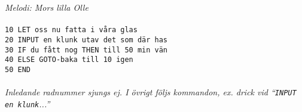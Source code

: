 {\footnotesize\textit{Melodi: Mors lilla Olle}}\\
\\
\texttt{10 LET oss nu fatta i våra glas}\\
\texttt{20 INPUT en klunk utav det som där has}\\
\texttt{30 IF du fått nog THEN till 50 min vän}\\
\texttt{40 ELSE GOTO-baka till 10 igen}\\
\texttt{50 END}\\
\\
{\footnotesize\textit{Inledande radnummer sjungs ej. I övrigt följs kommandon, ex. drick vid ``\texttt{INPUT en klunk}...''}}
